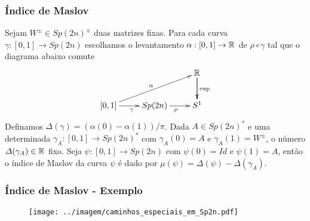 \documentclass{beamer}
\begin{document}
	\begin{frame}
		\frametitle{Índice de Maslov}
		\begin{definicao}
			Sejam $W^{\pm} \in Sp(2n)^{\pm}$ duas matrizes fixas. Para cada curva $\gamma:[0,1] \to Sp(2n)$ escolhamos o levantamento $\alpha:[0,1] \to \mathbb{R}^{}$ de $\rho\circ \gamma$ tal que o diagrama abaixo comute
			$$
			\xymatrix{
				& & \real{}\ar[d]\ar[d]^{\text{exp}}
				\\
				[0,1 ]\ar[urr]^{\alpha} \ar[r]_{\gamma} & Sp(2n) \ar[r]_{\rho} & S^{1}
			}
			$$	
			Definamos $\varDelta(\gamma) = (\alpha(0) - \alpha(1))/\pi$. Dada $A \in Sp(2n)^{*}$ e uma determinada $\gamma_{A}:[0,1] \to Sp(2n)^{*}$ com $\gamma_{A}(0) = A$ e $\gamma_{A}(1) = W^{\pm}$, o número $\varDelta(\gamma_{A}) \in \mathbb{R}^{}$ fixo.
			Seja $\psi:[0,1] \to Sp(2n)$ com $\psi(0)=Id$ e $\psi(1)=A$, então o índice de Maslov da curva $\psi$ é dado por $\mu(\psi) = \varDelta(\psi) - \varDelta(\gamma_{A})$.
			
		\end{definicao}
		
	\end{frame}
	
	\begin{frame}
			\frametitle{Índice de Maslov - Exemplo}
			\begin{figure}[!h]
				\centering
				\texttt{[image: ../imagem/caminhos\_especiais\_em\_Sp2n.pdf]}
			\end{figure}
	\end{frame}
	
\end{document}
